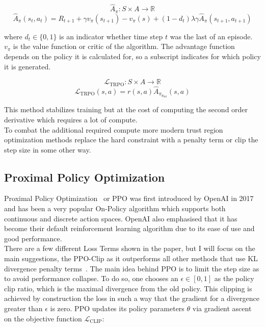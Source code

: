 \documentclass{article}
\begin{document}
\begin{equation}
    \hat A_\pi : S \times A \xrightarrow{} \mathbb{R} 
\end{equation}
\begin{equation*}
    \hat A_\pi(s_t, a_t)  = R_{t+1} + \gamma v_\pi(s_{t+1}) - v_\pi(s) + (1-d_t) \lambda \gamma \hat A_\pi(s_{t+1}, a_{t+1})
\end{equation*}

where $d_t \in \{0,1\}$ is an indicator whether time step $t$ was the last of an episode.
$v_\pi$ is the value function or critic of the algorithm.
The advantage function depends on the policy it is calculated for, so a subscript
indicates for which policy it is generated.

\begin{equation}
    {\mathcal L}_{\text{TRPO}}: S \times A \xrightarrow{} \mathbb{R}
\end{equation}
\begin{equation*}
    {\mathcal L}_{\text{TRPO}}(s, a) ={r(s, a) \hat A_{\pi_{\theta_{\text{old}}}}(s,a)}
\end{equation*}

\noindent This method stabilizes training but at the cost of computing the second order derivative
which requires a lot of compute.\\
To combat the additional required compute more modern trust region optimization methods
replace the hard constraint with a penalty term or clip the step size in some other way.

\subsection{Proximal Policy Optimization}
\noindent Proximal Policy Optimization~\cite{DBLP:journals/corr/SchulmanWDRK17} or PPO was first
introduced by OpenAI in 2017 and
has been a very popular On-Policy algorithm which supports both continuous and
discrete action spaces. OpenAI also emphasised that it has become their default
reinforcement learning algorithm due to its ease of use and good performance.\\
There are a few different Loss Terms shown in the paper, but I will focus on the main
suggestions, the PPO-Clip as it outperforms all other methods that use KL divergence penalty terms~\cite{DBLP:journals/corr/abs-2006-05990}.
The main idea behind PPO is to limit the step size as to avoid performance
collapse. To do so, one chooses an $\epsilon \in [0,1]$ as the policy clip ratio,
which is the maximal divergence from the old policy. This clipping is achieved
by construction the loss in such a way that the gradient for a divergence greater than $\epsilon$ is zero.
PPO updates its policy parameters $\theta$ via gradient ascent on the objective function ${\mathcal L}_{\mathrm{CLIP}}$:
\end{document}
